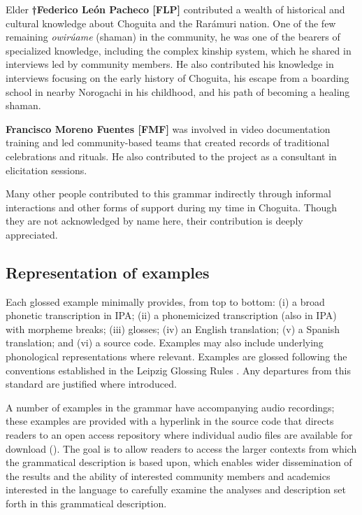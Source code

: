 \medskip

\noindent Elder \textbf{†Federico León Pacheco [FLP]} contributed a wealth of historical and cultural knowledge about Choguita and the Rarámuri nation. One of the few remaining \textit{owirúame} (shaman) in the community, he was one of the bearers of specialized knowledge, including the complex kinship system, which he shared in interviews led by community members. He also contributed his knowledge in interviews focusing on the early history of Choguita, his escape from a boarding school in nearby Norogachi in his childhood, and his path of becoming a healing shaman.

\medskip

\noindent \textbf{Francisco Moreno Fuentes [FMF]} was involved in video documentation training and led community-based teams that created records of traditional celebrations and rituals. He also contributed to the project as a consultant in elicitation sessions.

\medskip

Many other people contributed to this grammar indirectly through informal interactions and other forms of support during my time in Choguita. Though
they are not acknowledged by name here, their contribution is deeply appreciated.

\subsection{Representation of examples}
\label{subsec: representation of examples}

Each glossed example minimally provides, from top to bottom: (i) a broad phonetic transcription in IPA; (ii) a phonemicized transcription (also in IPA) with morpheme breaks; (iii) glosses; (iv) an English translation; (v) a {Spanish} translation; and (vi) a source code. Examples may also include underlying phonological representations where relevant. Examples are glossed following the conventions established in the Leipzig Glossing Rules \citep{comrie2008leipzig}. Any departures from this standard are justified where introduced.

A number of examples in the grammar have accompanying audio recordings; these examples are provided with a hyperlink in the source code that directs readers to an open access repository where individual audio files are available for download (\citealt{caballero_gabriela_2022_7268366}). The goal is to allow readers to access the larger contexts from which the grammatical description is based upon, which enables wider dissemination of the results and the ability of interested community members and academics interested in the language to carefully examine the analyses and description set forth in this grammatical description.

